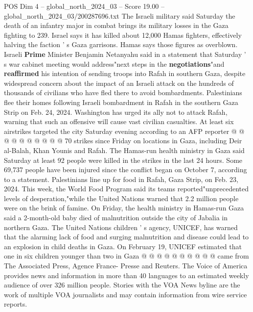 \begin{textsample}{POS Dim 4 – global\_north\_2024\_03 – Score 19.00 – global\_north\_2024\_03/200287696.txt}
The Israeli military said Saturday the death of an infantry major in combat brings its military losses in the Gaza fighting to 239.
Israel says it has killed about 12,000 Hamas fighters, effectively halving the faction ' s Gaza garrisons.
Hamas says those figures as overblown.
Israeli \textbf{Prime} Minister Benjamin Netanyahu said in a statement that Saturday ' s war cabinet meeting would address"next steps in the \textbf{negotiations}"and \textbf{reaffirmed} his intention of sending troops into Rafah in southern Gaza, despite widespread concern about the impact of an Israeli attack on the hundreds of thousands of civilians who have fled there to avoid bombardments.
Palestinians flee their homes following Israeli bombardment in Rafah in the southern Gaza Strip on Feb. 24, 2024.
Washington has urged its ally not to attack Rafah, warning that such an offensive will cause vast civilian casualties.
At least six airstrikes targeted the city Saturday evening according to an AFP reporter @ @ @ @ @ @ @ @ @ @ 70 strikes since Friday on locations in Gaza, including Deir al-Balah, Khan Younis and Rafah.
The Hamas-run health ministry in Gaza said Saturday at least 92 people were killed in the strikes in the last 24 hours.
Some 69,737 people have been injured since the conflict began on October 7, according to a statement.
Palestinians line up for food in Rafah, Gaza Strip, on Feb. 23, 2024.
This week, the World Food Program said its teams reported"unprecedented levels of desperation,"while the United Nations warned that 2.2 million people were on the brink of famine.
On Friday, the health ministry in Hamas-run Gaza said a 2-month-old baby died of malnutrition outside the city of Jabalia in northern Gaza.
The United Nations children ' s agency, UNICEF, has warned that the alarming lack of food and surging malnutrition and disease could lead to an explosion in child deaths in Gaza.
On February 19, UNICEF estimated that one in six children younger than two in Gaza @ @ @ @ @ @ @ @ @ @ came from The Associated Press, Agence France- Presse and Reuters.
The Voice of America provides news and information in more than 40 languages to an estimated weekly audience of over 326 million people.
Stories with the VOA News byline are the work of multiple VOA journalists and may contain information from wire service reports.

\end{textsample}
